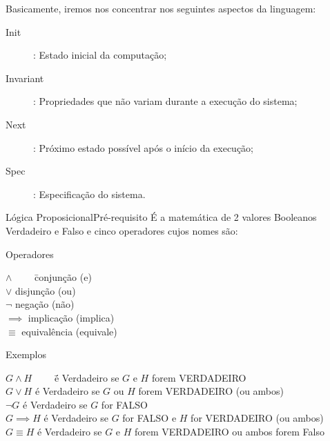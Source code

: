 \begin{frame}{\tla}{}
  Basicamente, iremos nos concentrar nos seguintes aspectos da linguagem:
  \begin{description}
  \item[Init]: Estado inicial da computação;
  \item[Invariant]: Propriedades que não variam durante a execução do sistema;
  \item[Next]: Próximo estado possível após o início da execução;
  \item[Spec]: Especificação do sistema.
  \end{description}
\end{frame}

\begin{frame}{Lógica Proposicional}{Pré-requisito}
  É a matemática de 2 valores Booleanos {\sc Verdadeiro} e {\sc Falso}
  e cinco operadores cujos nomes são:

  \begin{block}{Operadores}
    \begin{tabbing}
        $\land\qquad$ \= conjunção (e) \\
        $\lor$  \> disjunção (ou) \\
        $\lnot$ \> negação (não) \\
        $\implies$ \> implicação (implica) \\
        $\equiv$ \> equivalência (equivale) \\
      \end{tabbing}
  \end{block}

    \pause
    \begin{block}{Exemplos}\tiny
      \begin{tabbing}
        $G\land H\qquad$ \= é {\sc Verdadeiro} se $G$ e $H$ forem {\sc VERDADEIRO} \\
        $G\lor H$  \> é {\sc Verdadeiro} se $G$ ou $H$ forem {\sc VERDADEIRO} (ou ambos) \\
        $\lnot G$ \> é {\sc Verdadeiro} se $G$ for {\sc FALSO} \\
        $G\implies H$ \> é {\sc Verdadeiro} se $G$ for {\sc FALSO} e $H$ for {\sc VERDADEIRO} (ou ambos) \\
        $G\equiv H$ \> é {\sc Verdadeiro} se $G$ e $H$ forem {\sc VERDADEIRO} ou ambos forem {\sc Falso}\\
      \end{tabbing}
    \end{block}

\end{frame}

